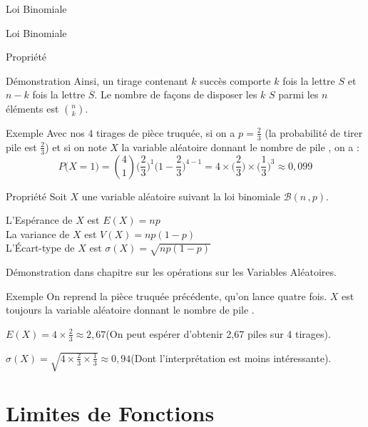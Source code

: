 \documentclass{coursbook}
\begin{document}
\begin{Gpartie}{Loi Binomiale}
\begin{Spartie}{Loi Binomiale}
\begin{SSpartie}{Propriété}
\begin{SSSpartie}{Démonstration}
                    Ainsi, un tirage contenant $k$ succès comporte $k$ fois la lettre $S$ et $n-k$ fois la lettre $\overline{S}$. Le nombre de façons de disposer les $k$ \og $S$ \fg{} parmi les $n$ éléments est $\binom{n}{k}$.
                \end{SSSpartie}
                \begin{SSSpartie}{Exemple} 
                    Avec nos $4$ tirages de pièce truquée, si on a $p=\frac{2}{3}$ (la probabilité de tirer \og pile \fg{} est $\frac{2}{3}$) et si on note $X$ la variable aléatoire donnant le nombre de \og pile \fg{}, on a :
                    \[P\big(X=1\big)=\binom{4}{1}\Bigg(\frac{2}{3}\Bigg)^1\Bigg(1-\frac{2}{3}\Bigg)^{4-1}=4\times\Bigg(\frac{2}{3}\Bigg)\times\Bigg(\frac{1}{3}\Bigg)^3\approx 0{,}099\]
                \end{SSSpartie}
            \end{SSpartie}
            \begin{SSpartie}{Propriété} 
                Soit $X$ une variable aléatoire suivant la loi binomiale $\mathcal{B}(n\,, p)$.

                L'Espérance de $X$ est $\boxed{E(X)=np}$ \\ La variance de $X$ est $\boxed{V(X)=np(1-p)}$ \\ L'Écart-type de $X$ est $\boxed{\sigma(X)=\sqrt{np(1-p)}}$

                Démonstration dans chapitre sur les opérations sur les Variables Aléatoires.
                \begin{SSSpartie}{Exemple} 
                    On reprend la pièce truquée précédente, qu'on lance quatre fois. $X$ est toujours la variable aléatoire donnant le nombre de \og pile \fg.

                    $E(X)=4\times\frac{2}{3}\approx 2{,}67$\quad (On peut espérer d'obtenir 2{,}67 piles sur 4 tirages).

                    $\sigma(X)=\sqrt{4\times\frac{2}{3}\times\frac{1}{3}}\approx 0{,}94$\quad (Dont l'interprétation est moins intéressante).
                \end{SSSpartie}
            \end{SSpartie}
        \end{Spartie}
    \end{Gpartie}






    \chapter{Limites de Fonctions}
\end{document}
